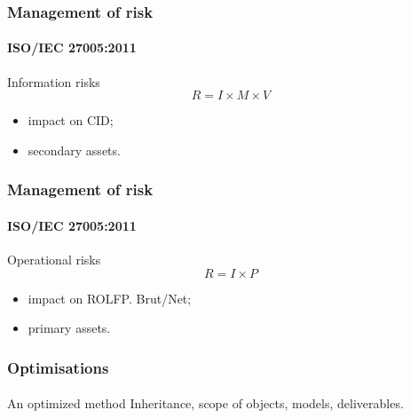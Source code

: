 \begin{frame}
    \frametitle{Management of risk}
    \framesubtitle{ISO/IEC 27005:2011}
    \begin{block}{Information risks}
        $$R = I \times M \times V$$
        \begin{itemize}
            \item impact on CID;
            \item secondary assets.
        \end{itemize}
    \end{block}
\end{frame}


\begin{frame}
    \frametitle{Management of risk}
    \framesubtitle{ISO/IEC 27005:2011}
    \begin{block}{Operational risks}
        $$R = I \times P$$
        \begin{itemize}
            \item impact on ROLFP. Brut/Net;
            \item primary assets.
        \end{itemize}
    \end{block}
\end{frame}


\begin{frame}
    \frametitle{Optimisations}
    \framesubtitle{}
    \begin{block}{An optimized method}
        Inheritance, scope of objects, models, deliverables.
    \end{block}
\end{frame}
